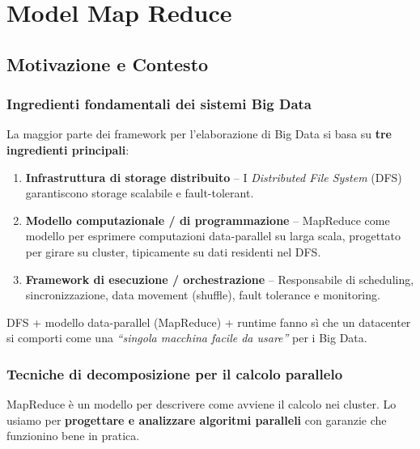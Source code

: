 \chapter{Model Map Reduce}
\section{Motivazione e Contesto}

\subsection{Ingredienti fondamentali dei sistemi Big Data}

La maggior parte dei framework per l'elaborazione di Big Data si basa su
\textbf{tre ingredienti principali}:

\begin{enumerate}
  \item \textbf{Infrastruttura di storage distribuito} -- I \emph{Distributed
    File System} (DFS) garantiscono storage scalabile e fault-tolerant.
  \item \textbf{Modello computazionale / di programmazione} -- MapReduce
    come modello per esprimere computazioni data-parallel su larga scala,
    progettato per girare su cluster, tipicamente su dati residenti nel DFS.
  \item \textbf{Framework di esecuzione / orchestrazione} -- Responsabile
    di scheduling, sincronizzazione, data movement (shuffle), fault tolerance
    e monitoring.
\end{enumerate}

\begin{takeaway}
  DFS + modello data-parallel (MapReduce) + runtime fanno sì che un datacenter
  si comporti come una \emph{``singola macchina facile da usare''} per i Big Data.
\end{takeaway}

\subsection{Tecniche di decomposizione per il calcolo parallelo}

MapReduce è un modello per descrivere come avviene il calcolo nei cluster.
Lo usiamo per \textbf{progettare e analizzare algoritmi paralleli} con garanzie
che funzionino bene in pratica.

